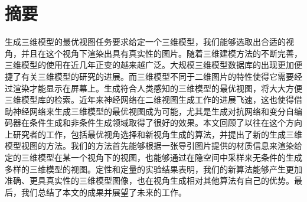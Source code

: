\documentclass[UTF8,openany,AutoFakeBold,AutoFakeSlant,cs4size]{ctexbook}
\title{}
\author{}
\date{}
\begin{document}
\newcommand{\chineseTitle}{三维模型最优二维视图生成方法研究}
\newcommand{\englishTitle}{Synthesizing best 2D views of 3D models}
\newcommand{\name}{黄道吉}
\newcommand{\studentID}{1600017857}
\newcommand{\school}{元培学院}
\newcommand{\major}{计算机科学与技术}
\newcommand{\advisor}{连宙辉}

\clearpage




\quad
\setcounter{page}{0}
\thispagestyle{empty}
\clearpage



\pagestyle{fancy}
\normalsize
\linespread{1.5}\selectfont
\chapter*{摘要}

生成三维模型的最优视图任务要求给定一个三维模型，我们能够选取出合适的视角，并且在这个视角下渲染出具有真实性的图片。随着三维建模方法的不断完善，三维模型的使用在近几年正变的越来越广泛。大规模三维模型数据库的出现更加便捷了有关三维模型的研究的进展。而三维模型不同于二维图片的特性使得它需要经过渲染才能显示在屏幕上。生成符合人类感知的三维模型的最优视图，将大大方便三维模型库的检索。近年来神经网络在二维视图生成工作的进展飞速，这也使得借助神经网络来生成三维模型的最优视图成为可能，尤其是生成对抗网络和变分自编码器在条件生成和非条件生成领域取得了很好的效果。本文回顾了以往在这个方向上研究者的工作，包括最优视角选择和新视角生成的算法，并提出了新的生成三维模型视图的方法。我们的方法首先能够根据一张导引图片提供的材质信息来渲染给定的三维模型在某一个视角下的视图，也能够通过在隐空间中采样来无条件的生成多样的三维模型的视图。定性和定量的实验结果表明，我们的新算法能够产生更加准确、更具真实性的三维模型图像，也在视角生成相对其他算法有自己的优势。最后，我们总结了本文的成果并展望了未来的工作。

\bigskip
{}



{
	\fancyhf{} %



	\fancyfoot[CO,CE]{~\thepage~}

	\renewcommand{\headrulewidth}{0.7pt} %

	\renewcommand{\footrulewidth}{0pt} %
}
\end{document}

